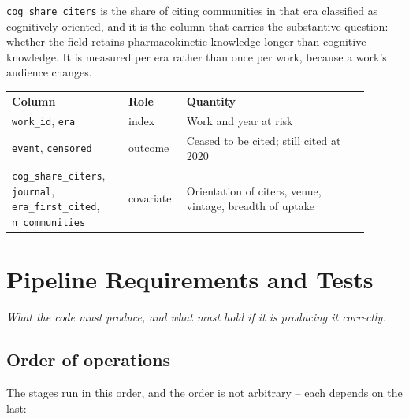 \documentclass[11pt]{article}
\newcommand{\seccap}[1]{{\slshape\small #1\par}\vspace{0.8em}}
\newcommand{\doublerule}{%
  \specialrule{\lightrulewidth}{0pt}{\doublerulesep}%
  \specialrule{\lightrulewidth}{0pt}{0pt}}
\newcommand{\code}[1]{\texttt{\small #1}}
\begin{document}
\code{cog\_share\_citers} is the share of citing communities in that era classified as
cognitively oriented, and it is the column that carries the substantive question: whether the
field retains pharmacokinetic knowledge longer than cognitive knowledge. It is measured per
era rather than once per work, because a work's audience changes.

\begin{center}
\small
\begin{tabular}{@{}>{\raggedright\arraybackslash}p{0.30\linewidth}>{\raggedright\arraybackslash}p{0.13\linewidth}>{\raggedright\arraybackslash}p{0.47\linewidth}@{}}
\toprule
\textbf{Column} & \textbf{Role} & \textbf{Quantity}\\
\doublerule
\code{work\_id}, \code{era} & index & Work and year at risk\\
\code{event}, \code{censored} & outcome & Ceased to be cited; still cited at 2020\\
\code{cog\_share\_citers}, \code{journal}, \code{era\_first\_cited}, \code{n\_communities}
 & covariate & Orientation of citers, venue, vintage, breadth of uptake\\
\bottomrule
\end{tabular}
\end{center}

\section{Pipeline Requirements and Tests}
\label{sec:pipeline}
\seccap{What the code must produce, and what must hold if it is producing it correctly.}

\subsection{Order of operations}

The stages run in this order, and the order is not arbitrary -- each depends on the last:
\end{document}
